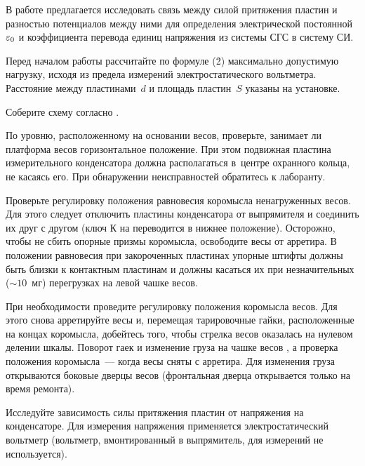 \zad

В работе предлагается исследовать связь между силой  притяжения пластин и разностью потенциалов между ними для
определения электрической постоянной $\varepsilon_0$ и коэффициента перевода единиц напряжения из системы СГС в систему СИ.


\n Перед началом работы рассчитайте по формуле (\r{2}) максимально допустимую нагрузку, исходя из предела измерений
электростатического вольтметра. Расстояние между пластинами~$d$ и площадь пластин~$S$ указаны на установке.

\n Соберите схему согласно .

По уровню, расположенному на основании весов, проверьте, занимает ли платформа весов горизонтальное положение. При этом
подвижная пластина измерительного конденсатора должна располагаться в~центре охранного кольца, не касаясь его. При
обнаружении неисправностей обратитесь к лаборанту.

Проверьте регулировку положения равновесия коромысла ненагруженных весов. Для этого следует отключить пластины
конденсатора от выпрямителя и соединить их друг с другом (ключ К на  переводится в нижнее положение). Осторожно,
чтобы не сбить опорные призмы коромысла, освободите весы от арретира. В положении равновесия при закороченных пластинах
упорные штифты должны быть близки к контактным пластинам и должны касаться их при незначительных ($\sim 10$~мг)
перегрузках на левой чашке весов.

При необходимости проведите регулировку положения коромысла весов. Для этого снова арретируйте весы и, перемещая
тарировочные гайки, расположенные на концах коромысла, добейтесь того, чтобы стрелка весов оказалась на нулевом делении
шкалы. Поворот гаек и изменение груза на чашке весов , а проверка
положения коромысла~--- когда весы сняты с арретира. Для изменения груза открываются боковые дверцы весов (фронтальная
дверца открывается только на время ремонта).

\n Исследуйте зависимость силы притяжения пластин от напряжения на конденсаторе. Для измерения напряжения применяется
электростатический вольтметр (вольтметр, вмонтированный в выпрямитель, для измерений не используется).

